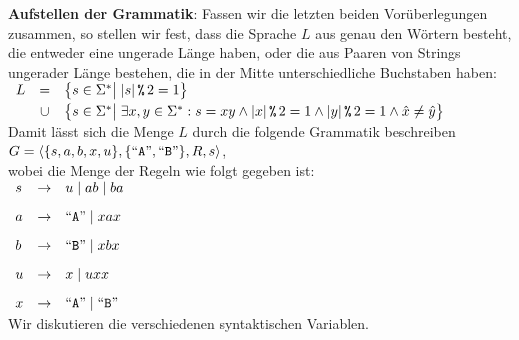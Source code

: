\noindent
\textbf{Aufstellen der Grammatik}:
Fassen wir die letzten beiden Vor\"uberlegungen zusammen, so stellen wir fest, dass die
Sprache $L$ aus genau den W\"ortern besteht, die entweder 
eine ungerade L\"ange haben, oder die aus Paaren von Strings ungerader L\"ange bestehen, die
in der Mitte unterschiedliche Buchstaben haben:
\\[0.2cm]
\hspace*{1.3cm}
$\begin{array}[t]{lcl}
  L & =    & \bigl\{ s \in \Sigma^* \big|\; |s| \,\texttt{\%}\, 2 = 1 \bigr\}  \\[0.1cm]
    & \cup & \bigl\{ s \in \Sigma^* \big|\; \exists x,y \in \Sigma^*: 
                             s = xy \wedge |x| \,\texttt{\%}\, 2 = 1 
                                    \wedge |y| \,\texttt{\%}\, 2 = 1  \wedge \hat{x} \not= \hat{y} \bigr\} 
 \end{array}$
\\[0.2cm]
Damit l\"asst sich die Menge $L$ durch die folgende Grammatik beschreiben
\\[0.2cm]
\hspace*{1.3cm}
$G = \langle \{ s, a, b, x, u \}, \{ \mbox{``\texttt{A}''}, \mbox{``\texttt{B}''} \}, R, s \rangle$,
\\[0.2cm]
wobei die Menge der Regeln wie folgt gegeben ist:
\\[0.2cm]
\hspace*{1.3cm}
$ 
\begin{array}[t]{lcl}
  s & \rightarrow & u \mid a b \mid  b a \\[0.3cm]
  a & \rightarrow & \mbox{``\texttt{A}''} \mid x a x         \\[0.3cm]
  b & \rightarrow & \mbox{``\texttt{B}''} \mid x b x         \\[0.3cm]
  u & \rightarrow & x \mid u x x         \\[0.3cm]
  x & \rightarrow & \mbox{``\texttt{A}''} \mid \mbox{``\texttt{B}''}
\end{array}$
\\[0.2cm]
Wir diskutieren die verschiedenen syntaktischen Variablen.
